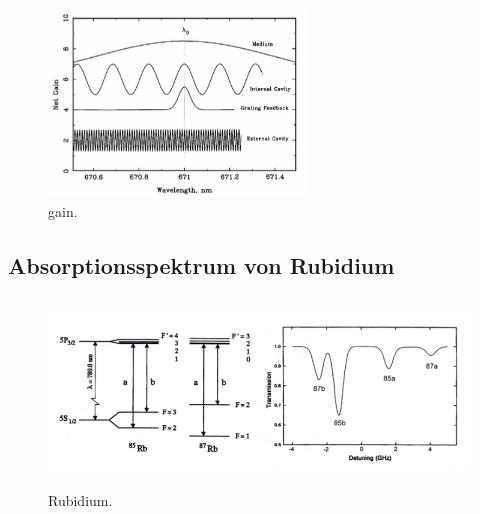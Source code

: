 \begin{figure}[H]
    \centering
    \includegraphics[height=5cm]{content/pics/gain.png}
    \caption{gain. \cite{V60}}
    \label{fig:grain}
\end{figure}

\subsection{Absorptionsspektrum von Rubidium}

\begin{figure}[H]
    \centering
    \includegraphics[height=5cm]{content/pics/Rubidium.png}
    \caption{Rubidium. \cite{V60}}
    \label{fig:rubidium}
\end{figure}


